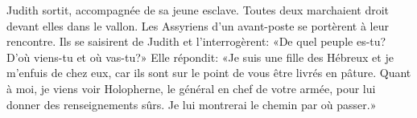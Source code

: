 Judith sortit, accompagnée de sa jeune esclave.
	Toutes deux marchaient droit devant elles dans le vallon.
Les Assyriens d'un avant-poste se portèrent à leur rencontre.
Ils se saisirent de Judith et l'interrogèrent:
	«De quel peuple es-tu? D'où viens-tu et où vas-tu?»
Elle répondit: «Je suis une fille des Hébreux et je m'enfuis de chez eux,
	car ils sont sur le point de vous être livrés en pâture.
Quant à moi, je viens voir Holopherne, le général en chef de votre armée,
	pour lui donner des renseignements sûrs.
	Je lui montrerai le chemin par où passer.»

